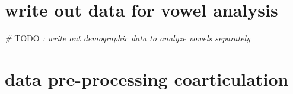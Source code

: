 \documentclass[
]{article}
\newenvironment{Shaded}{\begin{snugshade}}{\end{snugshade}}
\newcommand{\AlertTok}[1]{\textcolor[rgb]{0.94,0.16,0.16}{#1}}
\newcommand{\CommentTok}[1]{\textcolor[rgb]{0.56,0.35,0.01}{\textit{#1}}}
\begin{document}
\hypertarget{write-out-data-for-vowel-analysis}{%
\section{write out data for vowel analysis}\label{write-out-data-for-vowel-analysis}}

\begin{Shaded}
\begin{Highlighting}[]
\CommentTok{\# }\AlertTok{TODO}\CommentTok{ : write out demographic data to analyze vowels separately}
\end{Highlighting}
\end{Shaded}

\hypertarget{data-pre-processing-coarticulation}{%
\section{data pre-processing coarticulation}\label{data-pre-processing-coarticulation}}
\end{document}
